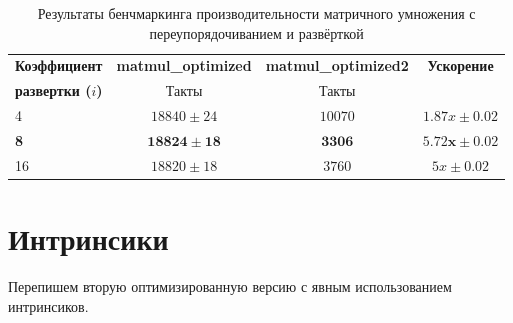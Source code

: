 \documentclass[12pt]{extarticle}
\begin{document}
\begin{table}[h!]
\centering
\caption{Результаты бенчмаркинга производительности матричного умножения с переупорядочиванием и развёрткой}
\label{table:unroll_comparison}
\begin{tabular}{|l|c|c|c|}
\toprule
\hline
\textbf{Коэффициент} & \textbf{matmul\_optimized} & \textbf{matmul\_optimized2} & \textbf{Ускорение} \\
\textbf{развертки ($i$)} & Такты & Такты &  \\  \hline \midrule
4  & $18840 \pm 24$ & $10070 $ & $1.87x \pm 0.02$ \\ \hline
\textbf{8}  & $\mathbf{18824 \pm 18}$ & $\mathbf{3306}$ & $\mathbf{5.72x \pm 0.02}$ \\ \hline
16 & $18820 \pm 18$ & $3760$ & $5x \pm 0.02$ \\ \hline  \bottomrule
\end{tabular}
\end{table}


\section{Интринсики}

Перепишем вторую оптимизированную версию с явным использованием интринсиков.
\end{document}
